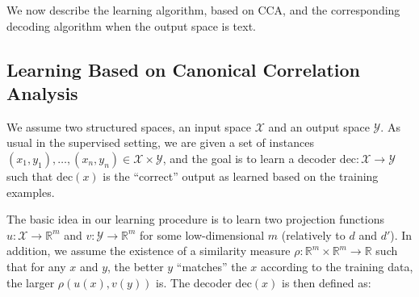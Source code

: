 \documentclass[letterpaper]{article}
\newcommand{\inx}{\mathcal{X}}
\newcommand{\outy}{\mathcal{Y}}
\newcommand{\decoder}{\mathrm{dec}}
\begin{document}
We now describe the learning algorithm, based on CCA, and the corresponding
decoding algorithm when the output space is text.

\subsection{Learning Based on Canonical Correlation Analysis}

We assume two structured spaces, an input space $\inx$ and an output space $\outy$.
As usual in the supervised setting, we are given a set of instances $(x_1,y_1),\ldots,(x_n,y_n) \in \inx \times \outy$,
and the goal is to learn a decoder $\decoder \colon \inx \rightarrow \outy$ such that $\decoder(x)$ is the ``correct''
output as learned based on the training examples.

The basic idea in our learning procedure is to learn two projection functions $u \colon \inx \rightarrow \mathbb{R}^m$
and $v \colon \outy \rightarrow \mathbb{R}^m$ for some low-dimensional $m$ (relatively to $d$ and $d'$). In addition, we assume the existence of
a similarity measure $\rho \colon \mathbb{R}^m \times \mathbb{R}^m \rightarrow \mathbb{R}$ such that for any $x$ and $y$,
the better $y$ ``matches'' the $x$ according to the training data, the larger $\rho(u(x),v(y))$ is.
The decoder $\decoder(x)$ is then defined as:
\end{document}
